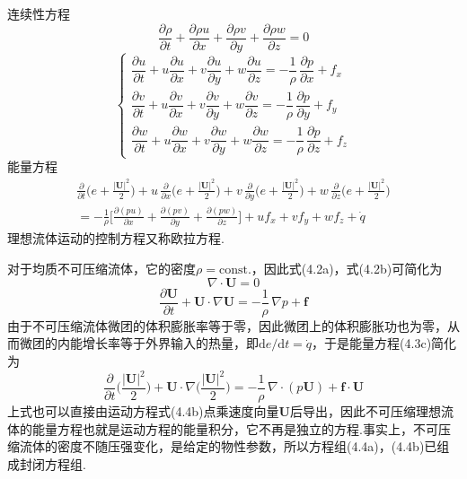 连续性方程
\begin{equation*}
\frac{\partial\rho}{\partial t}+\frac{\partial\rho u}{\partial x}+\frac{\partial\rho v}{\partial y}+\frac{\partial\rho w}{\partial z}=0
\tag{4.3a}
\end{equation*}
\begin{equation*}
\begin{cases}
\dfrac{\partial u}{\partial t}+u\dfrac{\partial u}{\partial x}+v\dfrac{\partial u}{\partial y}+w\dfrac{\partial u}{\partial z}=-\dfrac{1}{\rho}\,\dfrac{\partial p}{\partial x}+f_x\\[8pt]
\dfrac{\partial v}{\partial t}+u\dfrac{\partial v}{\partial x}+v\dfrac{\partial v}{\partial y}+w\dfrac{\partial v}{\partial z}=-\dfrac{1}{\rho}\,\dfrac{\partial p}{\partial y}+f_y\\[8pt]
\dfrac{\partial w}{\partial t}+u\dfrac{\partial w}{\partial x}+v\dfrac{\partial w}{\partial y}+w\dfrac{\partial w}{\partial z}=-\dfrac{1}{\rho}\,\dfrac{\partial p}{\partial z}+f_z
\end{cases}
\tag{4.3b}
\end{equation*}
能量方程
\begin{align*}
\frac{\partial}{\partial t}\Big(e+\frac{|\boldsymbol{U}|^{2}}{2}\Big)+u\,\frac{\partial}{\partial x}\Big(e+\frac{|\boldsymbol{U}|^{2}}{2}\Big)+v\,\frac{\partial}{\partial y}\Big(e+\frac{|\boldsymbol{U}|^{2}}{2}\Big)+w\,\frac{\partial}{\partial z}\Big(e+\frac{|\boldsymbol{U}|^{2}}{2}\Big)\\
=-\frac{1}{\rho}\bigg[\frac{\partial(pu)}{\partial x}+\frac{\partial(pv)}{\partial y}+\frac{\partial(pw)}{\partial z}\bigg]+u f_x+v f_y+w f_z+\dot{q}
\tag{4.3c}
\end{align*}
理想流体运动的控制方程又称欧拉方程.

对于均质不可压缩流体，它的密度$\rho=\mathrm{const.}$，因此式(4.2a)，式(4.2b)可简化为
\begin{equation*}
\nabla\cdot\boldsymbol{U}=0
\tag{4.4a}
\end{equation*}
\begin{equation*}
\frac{\partial\boldsymbol{U}}{\partial t}+\boldsymbol{U}\cdot\nabla\boldsymbol{U}=-\frac{1}{\rho}\,\nabla p+\boldsymbol{f}
\tag{4.4b}
\end{equation*}
由于不可压缩流体微团的体积膨胀率等于零，因此微团上的体积膨胀功也为零，从而微团的内能增长率等于外界输入的热量，即$\mathrm{d}e/\mathrm{d}t=\dot{q}$，于是能量方程(4.3c)简化为
\begin{equation*}
\frac{\partial}{\partial t}\Big(\frac{|\boldsymbol{U}|^{2}}{2}\Big)+\boldsymbol{U}\cdot\nabla\Big(\frac{|\boldsymbol{U}|^{2}}{2}\Big)=-\frac{1}{\rho}\,\nabla\cdot(p\boldsymbol{U})+\boldsymbol{f}\cdot\boldsymbol{U}
\tag{4.4c}
\end{equation*}
上式也可以直接由运动方程式(4.4b)点乘速度向量$\boldsymbol{U}$后导出，因此不可压缩理想流体的能量方程也就是运动方程的能量积分，它不再是独立的方程.事实上，不可压缩流体的密度不随压强变化，是给定的物性参数，所以方程组(4.4a)，(4.4b)已组成封闭方程组.


